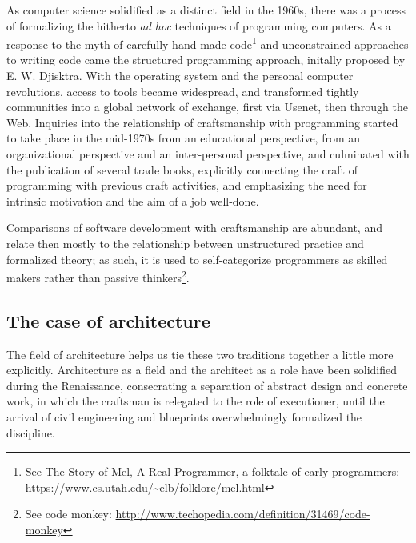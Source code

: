 \documentclass{article}
\begin{document}
As computer science solidified as a distinct field in the 1960s\cite{tedre_development_2006}, there was a process of formalizing the hitherto \textit{ad hoc} techniques of programming computers. As a response to the myth of carefully hand-made code\footnote{See The Story of Mel, A Real Programmer, a folktale of early programmers: \url{https://www.cs.utah.edu/~elb/folklore/mel.html}} and unconstrained approaches to writing code came the structured programming approach, initally proposed by E. W. Djisktra\cite{dijkstra_chapter_1972}. With the operating system and the personal computer revolutions, access to tools became widespread, and transformed tightly communities into a global network of exchange, first via Usenet, then through the Web. Inquiries into the relationship of craftsmanship with programming started to take place in the mid-1970s from an educational perspective\cite{dijkstra_craftsman_1982}, from an organizational perspective\cite{brooks_mythical_1975} and an inter-personal perspective\cite{weinberg_psychology_1998}, and culminated with the publication of several trade books\cite{martin_clean_2008,hendrickson_software_2002}, explicitly connecting the craft of programming with previous craft activities, and emphasizing the need for intrinsic motivation and the aim of a job well-done\cite{hoover_apprenticeship_2009,goodliffe_code_2007}.

Comparisons of software development with craftsmanship are abundant, and relate then mostly to the relationship between unstructured practice and formalized theory; as such, it is used to self-categorize programmers as skilled makers rather than passive thinkers\footnote{See code monkey: \url{http://www.techopedia.com/definition/31469/code-monkey}}.

\subsection{The case of architecture}

The field of architecture helps us tie these two traditions together a little more explicitly. Architecture as a field and the architect as a role have been solidified during the Renaissance\cite{pevsner_term_1942}, consecrating a separation of abstract design and concrete work, in which the craftsman is relegated to the role of executioner, until the arrival of civil engineering and blueprints overwhelmingly formalized the discipline.
\end{document}
